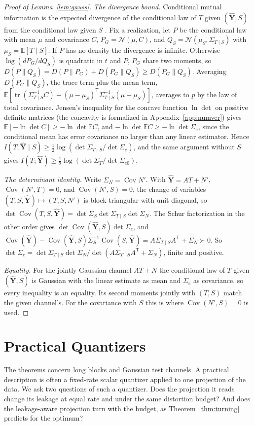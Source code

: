 \documentclass[11pt,onecolumn]{IEEEtran}
\newcommand{\E}{\mathbb{E}}
\newcommand{\tr}{\operatorname{tr}}
\newcommand{\Cov}{\operatorname{Cov}}
\newcommand{\hY}{\hat{\mathbf Y}}
\newcommand{\Se}{\Sigma_{e}}
\newcommand{\Sez}{\Sigma_{e0}}
\newcommand{\Kc}{\Sigma_{T\mid S}}
\begin{document}
\begin{proof}[Proof of Lemma~\ref{lem:gauss}]
\emph{The divergence bound.} Conditional mutual information is the
expected divergence of the conditional law of $T$ given $(\hY,S)$ from
the conditional law given $S$ \cite{wyner1978,pinsker1964}. Fix a
realization, let $P$ be the conditional law with mean $\mu$ and
covariance $C$, $P_G=\mathcal N(\mu,C)$, and
$Q_S=\mathcal N(\mu_S,\Kc)$ with $\mu_S=\E[T\mid S]$. If $P$ has no density the divergence is
infinite. Otherwise $\log(dP_G/dQ_S)$ is quadratic in $t$ and $P$, $P_G$
share two moments, so $D(P\|Q_S)=D(P\|P_G)+D(P_G\|Q_S)\ge D(P_G\|Q_S)$.
Averaging $D(P_G\|Q_S)$, the trace term plus the mean term,
$\E[\tr(\Kc^{-1}C)+(\mu-\mu_S)^{\mathsf T}\Kc^{-1}(\mu-\mu_S)]$, averages to
$p$ by the law of total covariance. Jensen's inequality for the concave
function $\ln\det$ on positive definite matrices (the concavity is
formalized in Appendix~\ref{app:numver}) gives $\E[-\ln\det C]\ge-\ln\det\E C$, and
$-\ln\det\E C\ge-\ln\det\Se$, since the conditional mean
has error covariance no larger than any linear estimator. Hence
$I(T;\hY\mid S)\ge\tfrac12\log(\det\Kc/\det\Se)$, and the same argument
without $S$ gives $I(T;\hY)\ge\tfrac12\log(\det\Sigma_T/\det\Sez)$.

\emph{The determinant identity.} Write $\Sigma_N=\Cov N'$. With $\hY=AT+N'$, $\Cov(N',T)=0$, and
$\Cov(N',S)=0$, the change of variables $(T,S,\hY)\mapsto(T,S,N')$ is
block triangular with unit diagonal, so
$\det\Cov(T,S,\hY)=\det\Sigma_S\det\Kc\det\Sigma_N$. The Schur factorization
in the other order gives $\det\Cov(\hY,S)\det\Se$, and
$\Cov(\hY)-\Cov(\hY,S)\Sigma_S^{-1}\Cov(S,\hY)=A\Kc A^{\mathsf T}+\Sigma_N\succ0$.
So $\det\Se=\det\Kc\det\Sigma_N/\det(A\Kc A^{\mathsf T}+\Sigma_N)$, finite and
positive.

\emph{Equality.} For the jointly Gaussian channel $AT+N$ the conditional
law of $T$ given $(\hY,S)$ is Gaussian with the linear estimate as mean
and $\Se$ as covariance, so every inequality is an equality. Its second
moments jointly with $(T,S)$ match the given channel's. For the
covariance with $S$ this is where $\Cov(N',S)=0$ is used.
\end{proof}

\section{Practical Quantizers}
\label{sec:quant}

The theorems concern long blocks and Gaussian test channels. A practical
description is often a fixed-rate scalar quantizer applied to one
projection of the data. We ask two questions of such a quantizer. Does
the projection it reads change its leakage at equal rate and under the
same distortion budget? And does the leakage-aware projection turn with the budget,
as Theorem~\ref{thm:turning} predicts for the optimum?
\end{document}
